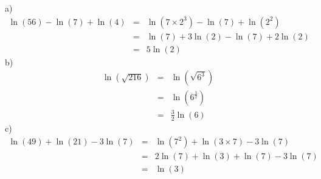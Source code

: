 a) \begin{eqnarray*}
  \ln(56)-\ln(7)+\ln(4) &=& \ln(7\times2^3)-\ln(7)+\ln(2^2) \\
  &=& \ln(7) + 3\ln(2)-\ln(7)+2\ln(2) \\
  &=& 5\ln(2)
\end{eqnarray*}
b) \begin{eqnarray*}
  \ln(\sqrt{216}) &=& \ln(\sqrt{6^3}) \\
  &=& \ln(6^\frac{3}{2}) \\
  &=& \frac{3}{2}\ln(6)
\end{eqnarray*} 
c)
\begin{eqnarray*}
  \ln(49)+\ln(21)-3\ln(7) &=& \ln(7^2)+\ln(3\times7)-3\ln(7) \\
    &=& 2\ln(7) + \ln(3) + \ln(7) - 3\ln(7) \\
    &=& \ln(3)
\end{eqnarray*}
